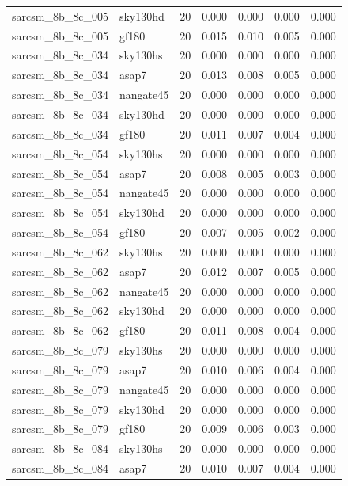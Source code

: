 \begin{tabular}{llrrrrr}
sarcsm\_8b\_8c\_005 & sky130hd & 20 & 0.000 & 0.000 & 0.000 & 0.000 \\
sarcsm\_8b\_8c\_005 & gf180 & 20 & 0.015 & 0.010 & 0.005 & 0.000 \\
sarcsm\_8b\_8c\_034 & sky130hs & 20 & 0.000 & 0.000 & 0.000 & 0.000 \\
sarcsm\_8b\_8c\_034 & asap7 & 20 & 0.013 & 0.008 & 0.005 & 0.000 \\
sarcsm\_8b\_8c\_034 & nangate45 & 20 & 0.000 & 0.000 & 0.000 & 0.000 \\
sarcsm\_8b\_8c\_034 & sky130hd & 20 & 0.000 & 0.000 & 0.000 & 0.000 \\
sarcsm\_8b\_8c\_034 & gf180 & 20 & 0.011 & 0.007 & 0.004 & 0.000 \\
sarcsm\_8b\_8c\_054 & sky130hs & 20 & 0.000 & 0.000 & 0.000 & 0.000 \\
sarcsm\_8b\_8c\_054 & asap7 & 20 & 0.008 & 0.005 & 0.003 & 0.000 \\
sarcsm\_8b\_8c\_054 & nangate45 & 20 & 0.000 & 0.000 & 0.000 & 0.000 \\
sarcsm\_8b\_8c\_054 & sky130hd & 20 & 0.000 & 0.000 & 0.000 & 0.000 \\
sarcsm\_8b\_8c\_054 & gf180 & 20 & 0.007 & 0.005 & 0.002 & 0.000 \\
sarcsm\_8b\_8c\_062 & sky130hs & 20 & 0.000 & 0.000 & 0.000 & 0.000 \\
sarcsm\_8b\_8c\_062 & asap7 & 20 & 0.012 & 0.007 & 0.005 & 0.000 \\
sarcsm\_8b\_8c\_062 & nangate45 & 20 & 0.000 & 0.000 & 0.000 & 0.000 \\
sarcsm\_8b\_8c\_062 & sky130hd & 20 & 0.000 & 0.000 & 0.000 & 0.000 \\
sarcsm\_8b\_8c\_062 & gf180 & 20 & 0.011 & 0.008 & 0.004 & 0.000 \\
sarcsm\_8b\_8c\_079 & sky130hs & 20 & 0.000 & 0.000 & 0.000 & 0.000 \\
sarcsm\_8b\_8c\_079 & asap7 & 20 & 0.010 & 0.006 & 0.004 & 0.000 \\
sarcsm\_8b\_8c\_079 & nangate45 & 20 & 0.000 & 0.000 & 0.000 & 0.000 \\
sarcsm\_8b\_8c\_079 & sky130hd & 20 & 0.000 & 0.000 & 0.000 & 0.000 \\
sarcsm\_8b\_8c\_079 & gf180 & 20 & 0.009 & 0.006 & 0.003 & 0.000 \\
sarcsm\_8b\_8c\_084 & sky130hs & 20 & 0.000 & 0.000 & 0.000 & 0.000 \\
sarcsm\_8b\_8c\_084 & asap7 & 20 & 0.010 & 0.007 & 0.004 & 0.000 \\

\end{tabular}
